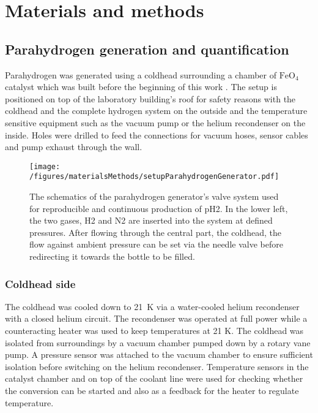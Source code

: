 \chapter{Materials and methods}\label{chap:MaterialsAndMethods}
\label{chapter:matMeth}
    \section{Parahydrogen generation and quantification}
    Parahydrogen was generated using a coldhead surrounding a chamber of $\mathrm{FeO_4}$ catalyst which was built before the beginning of this work \cite{hovener_continuous-flow_2013}. The setup is positioned on top of the laboratory building's roof for safety reasons with the coldhead and the complete hydrogen system on the outside and the temperature sensitive equipment such as the vacuum pump or the helium recondenser on the inside. Holes were drilled to feed the connections for vacuum hoses, sensor cables and pump exhaust through the wall.
    \begin{figure}
        \texttt{[image: /figures/materialsMethods/setupParahydrogenGenerator.pdf]}
        \caption[Parahydrogen generator scheme]{The schematics of the parahydrogen generator's valve system used for reproducible and continuous production of pH2. In the lower left, the two gases, H2 and N2 are inserted into the system at defined pressures. After flowing through the central part, the coldhead, the flow against ambient pressure can be set via the needle valve before redirecting it towards the bottle to be filled.}
        \label{figure:materialsMethods:pH2Generator}
    \end{figure}
        \subsection{Coldhead side}
            The coldhead was cooled down to \SI{21}{\kelvin} via a water-cooled helium recondenser with a closed helium circuit. The recondenser was operated at full power while a counteracting heater was used to keep temperatures at 21 K. The coldhead was isolated from surroundings by a vacuum chamber pumped down by a rotary vane pump. A pressure sensor was attached to the vacuum chamber to ensure sufficient isolation before switching on the helium recondenser. Temperature sensors in the catalyst chamber and on top of the coolant line were used for checking whether the conversion can be started and also as a feedback for the heater to regulate temperature.
